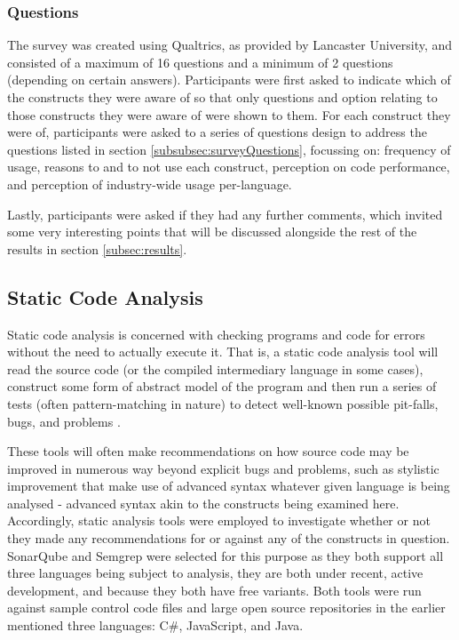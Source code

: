 \documentclass{article}
\begin{document}
        \subsubsection{Questions}
            The survey was created using Qualtrics, as provided by Lancaster University, and consisted of a maximum of 16 questions and a minimum of 2 questions (depending on certain answers).
            Participants were first asked to indicate which of the constructs they were aware of so that only questions and option relating to those constructs they were aware of were shown to them. For each construct they were of, participants were asked to a series of questions design to address the questions listed in section \ref{subsubsec:surveyQuestions}, focussing on: frequency of usage, reasons to and to not use each construct, perception on code performance, and perception of industry-wide usage per-language.
            
            Lastly, participants were asked if they had any further comments, which invited some very interesting points that will be discussed alongside the rest of the results in section \ref{subsec:results}.
    \subsection{Static Code Analysis}
        Static code analysis is concerned with checking programs and code for errors without the need to actually execute it. That is, a static code analysis tool will read the source code (or the compiled intermediary language in some cases), construct some form of abstract model of the program and then run a series of tests (often pattern-matching in nature) to detect well-known possible pit-falls, bugs, and problems \cite{staticCodeAnalysis}.

        These tools will often make recommendations on how source code may be improved in numerous way beyond explicit bugs and problems, such as stylistic improvement that make use of advanced syntax whatever given language is being analysed - advanced syntax akin to the constructs being examined here. Accordingly, static analysis tools were employed to investigate whether or not they made any recommendations for or against any of the constructs in question. SonarQube and Semgrep were selected for this purpose as they both support all three languages being subject to analysis, they are both under recent, active development, and because they both have free variants. Both tools were run against sample control code files and large open source repositories in the earlier mentioned three languages: C\#, JavaScript, and Java.
            
\end{document}
